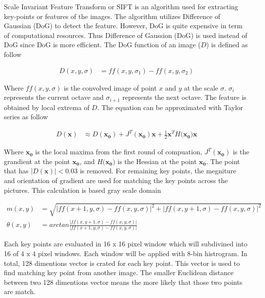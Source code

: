 \documentclass[11pt]{article}
\begin{document}
Scale Invariant Feature Transform or SIFT is an algorithm used for extracting key-points or features of the images. The algorithm utilizes Difference of Gaussian (DoG) to detect the feature. However, DoG is quite expensive in term of computational resources. Thus Difference of Gaussion (DoG) is used instead of DoG since DoG is more efficient. The DoG function of an image ($D$) is defined as follow

\begin{align*}
D(x,y,\sigma) &= ff(x, y, \sigma_1) - ff(x, y, \sigma_2)
\end{align*}

Where $ff(x, y, \sigma)$ is the convolved image of point $x$ and $y$ at the scale $\sigma$. $\sigma_i$ represents the current octave and $\sigma_{i+1}$ represents the next octave. The feature is obtained by local extrema of $D$. The equation can be approximated with Taylor series as follow

\begin{align*}
D(\mathbf{x}) &\approx D(\mathbf{x_0}) + J^T(\mathbf{x_0})\mathbf{x} + \frac{1}{2}\mathbf{x}^T H(\mathbf{x_0)}\mathbf{x}
\end{align*}

Where $\mathbf{x_0}$ is the local maxima from the first round of compuation, $J^T(\mathbf{x_0})$ is the grandient at the point $\mathbf{x_0}$, and $ H(\mathbf{x_0)}$ is the Hessian at the point $\mathbf{x_0}$. The point that has $|D(\mathbf{x})| < 0.03$ is removed. For remaining key points, the megniture and orientation of gradient are used for matching the key points across the pictures. This calculation is based gray scale domain

\begin{align*}
m(x,y) &= \sqrt{|ff(x+1, y, \sigma) - ff(x, y, \sigma)|^2 + |ff(x, y+1, \sigma) - ff(x, y, \sigma)|^2} \\
\theta(x,y) &= arctan \frac{|ff(x, y+1, \sigma) - ff(x, y, \sigma)|}{|ff(x+1, y, \sigma) - ff(x, y, \sigma)|}
\end{align*}

Each key points are evaluated in 16 x 16 pixel window which will subdivined into 16 of 4 x 4 pixel windows. Each window will be applied with 8-bin histrogram. In total, 128 dimentions vector is crated for each key point. This vector is used to find matching key point from another image. The smaller Euclidean distance between two 128 dimentions vector means the more likely that those two points are match.

\end{document}
